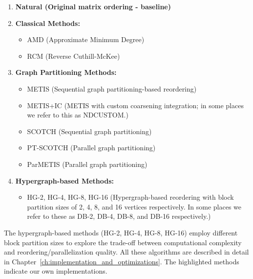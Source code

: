 \begin{enumerate}

   \item \textbf{Natural (Original matrix ordering - baseline)}
   
   \item \textbf{Classical Methods:}
   \begin{itemize}[noitemsep,topsep=0pt]
      \item AMD (Approximate Minimum Degree)
      \item RCM (Reverse Cuthill-McKee)
   \end{itemize}
   
   \item \textbf{Graph Partitioning Methods:}
   \begin{itemize}[noitemsep,topsep=0pt]
      \item METIS (Sequential graph partitioning-based reordering)
      \item \colorbox{yellow!60}{METIS+IC} (METIS with custom coarsening integration; in some places we refer to this as NDCUSTOM.)
      \item SCOTCH (Sequential graph partitioning)
      \item PT-SCOTCH (Parallel graph partitioning)
      \item ParMETIS (Parallel graph partitioning)
   \end{itemize}
   
   \item \textbf{Hypergraph-based Methods:}
   \begin{itemize}[noitemsep,topsep=0pt]
      \item \colorbox{yellow!60}{HG-2}, \colorbox{yellow!60}{HG-4}, \colorbox{yellow!60}{HG-8}, \colorbox{yellow!60}{HG-16} (Hypergraph-based reordering with block partition sizes of 2, 4, 8, and 16 vertices respectively. In some places we refer to these as DB-2, DB-4, DB-8, and DB-16 respectively.) 
   \end{itemize}

\end{enumerate}

The hypergraph-based methods (HG-2, HG-4, HG-8, HG-16) employ different block partition sizes to explore the trade-off between computational complexity and reordering/parallelization quality. All these algorithms are described in detail in Chapter~\ref{ch:implementation_and_optimizations}. The \colorbox{yellow!60}{highlighted methods} indicate our own implementations. 

